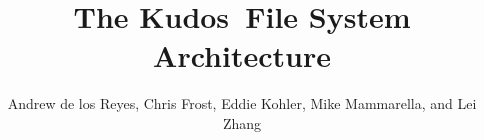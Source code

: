 \documentclass[10pt,twocolumn,letterpaper]{article}
\newcommand{\Kudos}{Kudos}
\begin{document}
\normalsize

\title{\sffamily\textbf{The \Kudos\ File System Architecture}}


\author{\sffamily Andrew de los Reyes, Chris Frost, Eddie Kohler, Mike
Mammarella, and Lei Zhang \\
\noalign{\vskip2pt}
 \\
\noalign{\vskip2pt}
 \\
\noalign{\vskip-.25in}
\null}
\date{}
\maketitle

\def\assast{\raise.2ex\hbox{$^\ast$}}

























\end{document}
